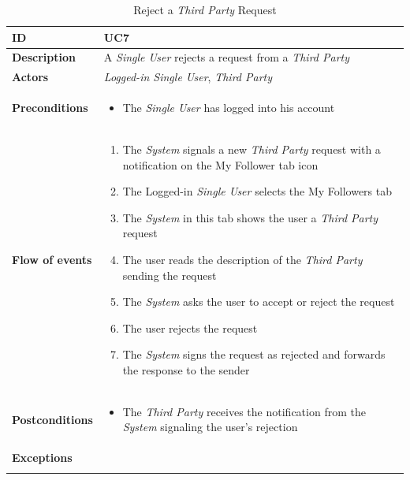 \documentclass[titlepage]{article}
\begin{document}
\begin{longtable}{| p{3 cm} | p{10 cm} |} 
			\hline
			{\bf ID} & UC7 \\
			\hline
			{\bf Description} & A {\it Single User} rejects a request from a {\it Third Party}\\
			\hline
			{\bf Actors} & {\it Logged-in {\it Single User}}, {\it Third Party} \\
			\hline
			{\bf Preconditions} & 		
							\begin{itemize}
								\item The {\it Single User}  has  logged into his account 
							\end{itemize}
			\\
			\hline
			{\bf Flow of events} & 
							\begin{enumerate}
								\item The {\it System} signals a new {\it Third Party} request with a notification on the My Follower tab icon
\item The Logged-in {\it Single User} selects the My Followers tab
\item The {\it System}  in this tab shows the user a {\it Third Party} request
\item The user reads the description of the {\it Third Party} sending the request
\item The {\it System} asks the user to accept or reject the request
\item The user rejects the request
\item The {\it System} signs the request as rejected and forwards the response to the sender
							\end{enumerate}
			
			 \\
			\hline
			{\bf Postconditions} & 
							\begin{itemize}
								\item The {\it Third Party} receives the notification from the {\it System} signaling the user’s rejection

							\end{itemize}
			\\
			\hline
			{\bf Exceptions} & 
							
			\\
			\hline
			\caption{Reject a {\it Third Party} Request}
			\end{longtable}

\end{document}
